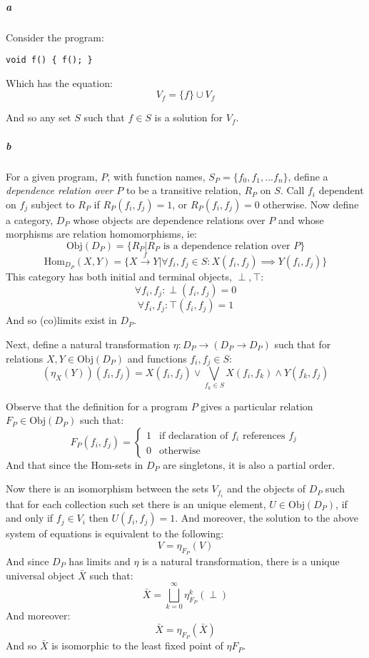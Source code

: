 \documentclass{article}
\begin{document}
\subparagraph{a}
Consider the program:
\begin{verbatim}
void f() { f(); }
\end{verbatim}

Which has the equation:
\[ V_f = \{ f \} \cup V_f \]

And so any set $S$ such that $f \in S$ is a solution for $V_f$.

\subparagraph{b}
For a given program, $P$, with function names, $S_P = \{ f_0, f_1, ... f_n \}$, define a \emph{dependence relation over $P$} to be a transitive relation, $R_P$ on $S$.  Call $f_i$ dependent on $f_j$ subject to $R_P$ if $R_P(f_i, f_j) = 1$, or $R_P(f_i, f_j) = 0$ otherwise.  Now define a category, $D_P$ whose objects are dependence relations over $P$ and whose morphisms are relation homomorphisms, ie:
\[ \text{Obj}(D_P) = \{ R_P | R_P \text{ is a dependence relation over } P \} \]
\[ \text{Hom}_{D_P}(X, Y) = \{
	X \stackrel{f}{\to} Y | 
	\forall f_i, f_j \in S : X(f_i, f_j) \implies Y(f_i, f_j)
\} \]
This category has both initial and terminal objects, $\perp, \top$:
\[ \forall f_i, f_j : \perp(f_i, f_j) = 0 \]
\[ \forall f_i, f_j : \top(f_i, f_j) = 1 \]
And so (co)limits exist in $D_P$. 

Next, define a natural transformation $\eta : D_P \to (D_P \to D_P)$ such that for relations $X, Y \in \text{Obj} (D_P)$ and functions $f_i,f_j \in S$:
\[ \left( \eta_X(Y) \right)(f_i, f_j) = X(f_i, f_j) \vee \bigvee \limits_{f_k \in S} X(f_i, f_k) \wedge Y(f_k, f_j) \]

Observe that the definition for a program $P$ gives a particular relation $F_P \in \text{Obj}(D_P)$ such that:
\[ F_P \left( f_i, f_j \right) = \left \{ \begin{array}{cc}
1 & \text{if declaration of }f_i\text{ references } f_j \\
0 & \text{otherwise}
\end{array} \right. \]
And that since the Hom-sets in $D_P$ are singletons, it is also a partial order.

Now there is an isomorphism between the sets $V_{f_i}$ and the objects of $D_P$ such that for each collection such set there is an unique element, $U \in \text{Obj}(D_P)$, if and only if $f_j \in V_i$ then $U(f_i,f_j) = 1$.  And moreover, the solution to the above system of equations is equivalent to the following:
\[ V = \eta_{F_P}(V) \]
And since $D_P$ has limits and $\eta$ is a natural transformation, there is a unique universal object $\bar{X}$ such that:
\[ \bar{X} = \bigsqcup \limits_{k=0}^{\infty} \eta_{F_P}^k (\perp) \]
And moreover:
\[ \bar{X} = \eta_{F_P}(\bar{X}) \]
And so $\bar{X}$ is isomorphic to the least fixed point of $\eta{F_P}$.
\end{document}
